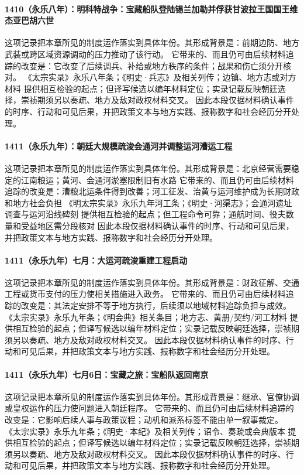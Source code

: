 \paragraph{1410（永乐八年）：明科特战争：宝藏船队登陆锡兰加勒并俘获甘波拉王国国王维杰亚巴胡六世} 这项记录把本章所见的制度运作落实到具体年份。其形成背景是：前期边防、地方武装或跨区域资源调动的压力推动了该行动。 它带来的、而且仍可由后续材料追踪的改变是：它改变了后续调兵、补给或地方秩序的条件；战果和伤亡须分开核对。 《太宗实录》永乐八年条；《明史·兵志》及相关列传；边镇、地方志或对方材料 提供相互检验的起点；但译写候选以编年材料定位；实录记载反映朝廷选择，崇祯期须另以奏疏、地方及敌对政权材料交叉。 因此本段仅据材料确认事件的时序、行动和可见后果，并把政策文本与地方实践、报称数字和社会经历分开处理。

\paragraph{1411（永乐九年）：朝廷大规模疏浚会通河并调整运河漕运工程} 这项记录把本章所见的制度运作落实到具体年份。其形成背景是：北京经营需要稳定的江南粮运；黄河、会通河淤塞限制旧有水路 它带来的、而且仍可由后续材料追踪的改变是：漕粮北运条件得到改善；河工征发、治黄与运河维护成为长期财政和地方社会负担 《明太宗实录》永乐九年河工条；《明史·河渠志》；会通河遗址调查与运河沿线碑刻 提供相互检验的起点；但工程命令可靠；通航时间、役夫数量和受益地区需分段核对 因此本段仅据材料确认事件的时序、行动和可见后果，并把政策文本与地方实践、报称数字和社会经历分开处理。

\paragraph{1411（永乐九年）七月：大运河疏浚重建工程启动} 这项记录把本章所见的制度运作落实到具体年份。其形成背景是：财政征解、交通工程或货币支付的压力使相关措施进入政务。 它带来的、而且仍可由后续材料追踪的改变是：其法定安排不等于地方执行，后续须以地域材料追踪负担与成效。 《太宗实录》永乐九年条；《明会典》相关条目；地方志、黄册/契约/河工材料 提供相互检验的起点；但译写候选以编年材料定位；实录记载反映朝廷选择，崇祯期须另以奏疏、地方及敌对政权材料交叉。 因此本段仅据材料确认事件的时序、行动和可见后果，并把政策文本与地方实践、报称数字和社会经历分开处理。

\paragraph{1411（永乐九年）七月6日：宝藏之旅：宝船队返回南京} 这项记录把本章所见的制度运作落实到具体年份。其形成背景是：继承、官僚协调或皇权运作的压力使问题进入朝廷程序。 它带来的、而且仍可由后续材料追踪的改变是：它影响后续人事与政策议程；动机和派系标签不能由单一叙事裁定。 《太宗实录》永乐九年条；《明史·本纪》及相关列传；诏令、奏疏或会典版本 提供相互检验的起点；但译写候选以编年材料定位；实录记载反映朝廷选择，崇祯期须另以奏疏、地方及敌对政权材料交叉。 因此本段仅据材料确认事件的时序、行动和可见后果，并把政策文本与地方实践、报称数字和社会经历分开处理。

